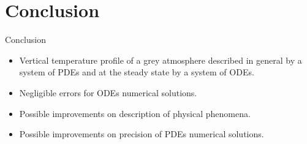 \documentclass[aspectratio=43]{beamer}
\begin{document}
\section{Conclusion}
\begin{frame}{Conclusion}
  \begin{itemize}
    \item Vertical temperature profile of a grey atmosphere described in general by a system of PDEs and at the steady state by a system of ODEs.
    \item Negligible errors for ODEs numerical solutions.
    \item Possible improvements on description of physical phenomena.
    \item Possible improvements on precision of PDEs numerical solutions.
  \end{itemize}
\end{frame}
\end{document}
